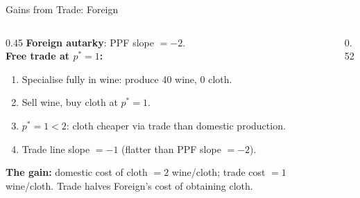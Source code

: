 \documentclass[aspectratio=169]{beamer}
\begin{document}
\begin{frame}{Gains from Trade: Foreign}
\begin{columns}[T]
\begin{column}{0.45\textwidth}
\textbf{Foreign autarky}: PPF slope $=-2$.\\[0.4em]
\textbf{Free trade at $p^{*}=1$:}
\begin{enumerate}\small
  \item Specialise fully in wine: produce 40 wine, 0
        cloth.
  \item Sell wine, buy cloth at $p^{*}=1$.
  \item $p^{*}=1<2$: cloth cheaper via trade than
        domestic production.
  \item Trade line slope $=-1$ (flatter than PPF
        slope $=-2$).
\end{enumerate}
\vspace{0.2em}
\textbf{The gain:} domestic cost of cloth $= 2$
wine/cloth; trade cost $= 1$ wine/cloth.
Trade halves Foreign's cost of obtaining cloth.
\end{column}
\begin{column}{0.52\textwidth}
\end{column}
\end{columns}
\end{frame}
\end{document}
